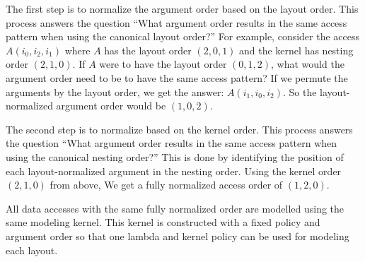 The first step is to normalize the argument order based on the layout order.
This process answers the question ``What argument order results in the same access pattern when using the canonical layout order?''
For example, consider the access $A(i_0,i_2,i_1)$ where $A$ has the layout order $(2,0,1)$ and the kernel has nesting order $(2,1,0)$.
If $A$ were to have the layout order $(0,1,2)$, what would the argument order need to be to have the same access pattern? 
If we permute the arguments by the layout order, we get the answer: $A(i_1, i_0, i_2)$.
So the layout-normalized argument order would be $(1,0,2)$. 

The second step is to normalize based on the kernel order. 
This process answers the question ``What argument order results in the same access pattern when using the canonical nesting order?''
This is done by identifying the position of each layout-normalized argument in the nesting order. 
Using the kernel order $(2,1,0)$ from above, We get a fully normalized access order of $(1,2,0)$.

All data accesses with the same fully normalized order are modelled using the same modeling kernel. 
This kernel is constructed with a fixed policy and argument order so that one lambda and kernel policy can be used for modeling each layout. 


